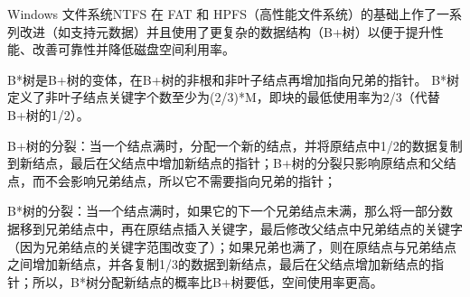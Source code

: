 Windows 文件系统NTFS 在 FAT 和 HPFS（高性能文件系统）的基础上作了一系列改进（如支持元数据）并且使用了更复杂的数据结构（B+树）以便于提升性能、改善可靠性并降低磁盘空间利用率。

B*树是B+树的变体，在B+树的非根和非叶子结点再增加指向兄弟的指针。
B*树定义了非叶子结点关键字个数至少为(2/3)*M，即块的最低使用率为2/3（代替B+树的1/2）。

B+树的分裂：当一个结点满时，分配一个新的结点，并将原结点中1/2的数据复制到新结点，最后在父结点中增加新结点的指针；B+树的分裂只影响原结点和父结点，而不会影响兄弟结点，所以它不需要指向兄弟的指针；

B*树的分裂：当一个结点满时，如果它的下一个兄弟结点未满，那么将一部分数据移到兄弟结点中，再在原结点插入关键字，最后修改父结点中兄弟结点的关键字（因为兄弟结点的关键字范围改变了）；如果兄弟也满了，则在原结点与兄弟结点之间增加新结点，并各复制1/3的数据到新结点，最后在父结点增加新结点的指针；所以，B*树分配新结点的概率比B+树要低，空间使用率更高。

\clearpage









